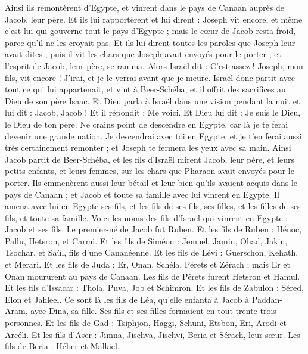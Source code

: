 \begin{multicols}{2}
Ainsi ils remontèrent d'Egypte, et vinrent dans le  pays de Canaan auprès de Jacob, leur père.
Et ils lui rapportèrent et lui dirent : Joseph vit encore, et même c’est lui qui gouverne tout le pays d'Egypte ; mais le cœur de Jacob resta froid, parce qu’il ne les croyait pas.
Et ils lui dirent toutes les paroles que Joseph leur avait dites ; puis il vit les chars que Joseph avait envoyés pour le porter ; et l'esprit de Jacob, leur père, se ranima.
Alors Israël dit : C'est assez ! Joseph, mon fils, vit encore ! J'irai, et je le verrai avant que je meure.
\VerseOne{}Israël donc partit avec tout ce qui lui appartenait, et vint à Beer-Schéba, et il offrit des sacrifices au Dieu de son père Isaac.
Et Dieu parla à Israël dans une vision pendant la nuit et lui dit : Jacob, Jacob ! Et il répondit : Me voici.
Et Dieu lui dit : Je suis le Dieu, le Dieu de ton père. Ne crains point de descendre en Egypte, car là je te ferai devenir une grande nation.
Je descendrai avec toi en Egypte, et je t'en ferai aussi très certainement remonter ; et Joseph te fermera les yeux avec sa main.
Ainsi Jacob partit de Beer-Schéba, et les fils d'Israël mirent Jacob, leur père, et leurs petits enfants, et leurs femmes, sur les chars que Pharaon avait envoyés pour le porter.
Ils emmenèrent aussi leur bétail et leur bien qu'ils avaient acquis dans le pays de Canaan ; et Jacob et toute sa famille avec lui vinrent en Egypte.
Il amena avec lui en Egypte ses fils, et les fils de ses fils, ses filles, et les filles de ses fils, et toute sa famille.
Voici les noms des fils d'Israël qui vinrent en Egypte : Jacob et ses fils. Le premier-né de Jacob fut Ruben.
Et les fils de Ruben : Hénoc, Pallu, Hetsron, et Carmi.
Et les fils de Siméon : Jemuel, Jamin, Ohad, Jakin, Tsochar, et Saül, fils d'une Cananéenne.
Et les fils de Lévi : Guerschon, Kehath, et Merari.
Et les fils de Juda : Er, Onan, Schéla, Pérets et Zérach ; mais Er et Onan moururent au pays de Canaan. Les fils de Pérets furent Hetsron et Hamul.
Et les fils d'Issacar : Thola, Puva, Job et Schimron.
Et les fils de Zabulon : Séred, Elon et Jahleel.
Ce sont là les fils de Léa, qu'elle enfanta à Jacob à Paddan-Aram, avec Dina, sa fille. Ses fils et ses filles formaient en tout trente-trois personnes.
Et les fils de Gad : Tsiphjon, Haggi, Schuni, Etsbon, Eri, Arodi et Areéli.
Et les fils d'Aser : Jimna, Jischva, Jischvi, Beria et Sérach, leur sœur. Les fils de Beria : Héber et Malkiel.

\end{multicols}
